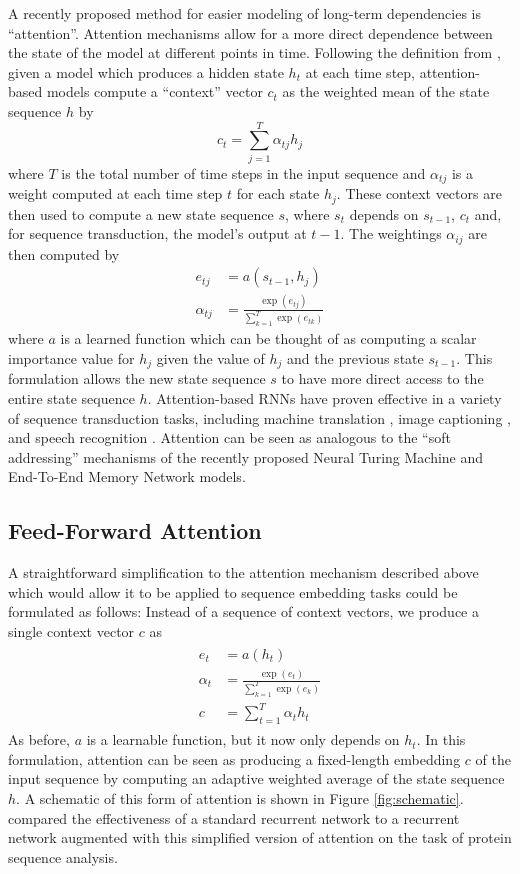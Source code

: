 \documentclass{article} %
\begin{document}
A recently proposed method for easier modeling of long-term dependencies is ``attention''.
Attention mechanisms allow for a more direct dependence between the state of the model at different points in time.
Following the definition from \cite{bahdanau2014neural}, given a model which produces a hidden state $h_t$ at each time step, attention-based models compute a ``context'' vector $c_t$ as the weighted mean of the state sequence $h$ by
$$
c_t = \sum_{j = 1}^T \alpha_{tj} h_j
$$
where $T$ is the total number of time steps in the input sequence and $\alpha_{tj}$ is a weight computed at each time step $t$ for each state $h_j$.
These context vectors are then used to compute a new state sequence $s$, where $s_t$ depends on $s_{t - 1}$, $c_t$ and, for sequence transduction, the model's output at $t - 1$.
The weightings $\alpha_{ij}$ are then computed by
\begin{align*}
e_{tj} &= a(s_{t - 1}, h_j)\\
\alpha_{tj} &= \frac{\exp(e_{tj})}{\sum_{k = 1}^T \exp(e_{tk})}
\end{align*}
where $a$ is a learned function which can be thought of as computing a scalar importance value for $h_j$ given the value of $h_j$ and the previous state $s_{t - 1}$.
This formulation allows the new state sequence $s$ to have more direct access to the entire state sequence $h$.
Attention-based RNNs have proven effective in a variety of sequence transduction tasks, including machine translation \cite{bahdanau2014neural}, image captioning \cite{xu2015show}, and speech recognition \cite{chan2015listen,bahdanau2015end}.
Attention can be seen as analogous to the ``soft addressing'' mechanisms of the recently proposed Neural Turing Machine \cite{graves2014neural} and End-To-End Memory Network \cite{sukhbaatar2015end} models.

\subsection{Feed-Forward Attention}

A straightforward simplification to the attention mechanism described above which would allow it to be applied to sequence embedding tasks could be formulated as follows:
Instead of a sequence of context vectors, we produce a single context vector $c$ as
\begin{align}
\begin{split}
\label{eq:ffattention}
e_t &= a(h_t)\\
\alpha_t &= \frac{\exp(e_t)}{\sum_{k = 1}^T \exp(e_k)}\\
c &= \sum_{t = 1}^T \alpha_t h_t
\end{split}
\end{align}
As before, $a$ is a learnable function, but it now only depends on $h_t$.
In this formulation, attention can be seen as producing a fixed-length embedding $c$ of the input sequence by computing an adaptive weighted average of the state sequence $h$.
A schematic of this form of attention is shown in Figure \ref{fig:schematic}.
\cite{sonderby2015convolutional} compared the effectiveness of a standard recurrent network to a recurrent network augmented with this simplified version of attention on the task of protein sequence analysis.
\end{document}

